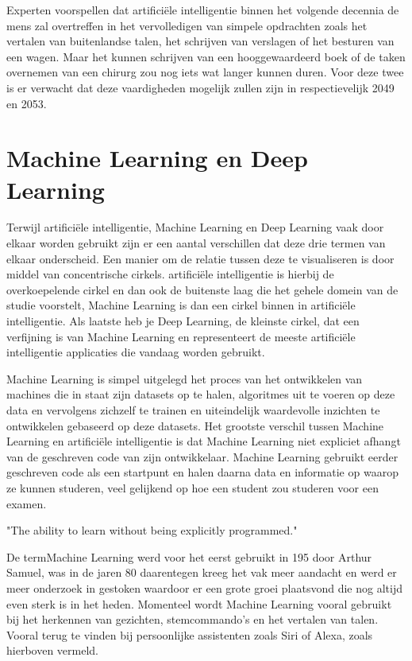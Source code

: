 \autocite{Katja2018} Experten voorspellen dat artificiële intelligentie binnen het volgende decennia de mens zal overtreffen in het vervolledigen van simpele opdrachten zoals het vertalen van buitenlandse talen, het schrijven van verslagen of het besturen van een wagen. Maar het kunnen schrijven van een hooggewaardeerd boek of de taken overnemen van een chirurg zou nog iets wat langer kunnen duren.
Voor deze twee is er verwacht dat deze vaardigheden mogelijk zullen zijn in respectievelijk 2049 en 2053.


\section{Machine Learning en Deep Learning}

Terwijl artificiële intelligentie, Machine Learning en Deep Learning vaak door elkaar worden gebruikt zijn er een aantal verschillen dat deze drie termen van elkaar onderscheid. Een manier om de relatie tussen deze te visualiseren is door middel van concentrische cirkels.
artificiële intelligentie is hierbij de overkoepelende cirkel en dan ook de buitenste laag die het gehele domein van de studie voorstelt, Machine Learning is dan een cirkel binnen in artificiële intelligentie. Als laatste heb je Deep Learning, de kleinste cirkel, dat een verfijning is van Machine Learning en representeert de meeste artificiële intelligentie applicaties die vandaag worden gebruikt.

Machine Learning is simpel uitgelegd het proces van het ontwikkelen van machines die in staat zijn datasets op te halen, algoritmes uit te voeren op deze data en vervolgens zichzelf te trainen en uiteindelijk waardevolle inzichten te ontwikkelen gebaseerd op deze datasets.
Het grootste verschil tussen Machine Learning en artificiële intelligentie is dat Machine Learning niet expliciet afhangt van de geschreven code van zijn ontwikkelaar. Machine Learning gebruikt eerder geschreven code als een startpunt en halen daarna data en informatie op waarop ze kunnen studeren, veel gelijkend op hoe een student zou studeren voor een examen.

\autocite{Arthur Samuel, 1959} "The ability to learn without being explicitly programmed."

De termMachine Learning werd voor het eerst gebruikt in 195 door Arthur Samuel,  was in de jaren 80 daarentegen kreeg het vak meer aandacht en werd er meer onderzoek in gestoken waardoor er een grote groei plaatsvond die nog altijd even sterk is in het heden. \autocite{KeithD.2019} 
Momenteel wordt Machine Learning vooral gebruikt bij het herkennen van gezichten, stemcommando's en het vertalen van talen. Vooral terug te vinden bij persoonlijke assistenten zoals Siri of Alexa, zoals hierboven vermeld.

